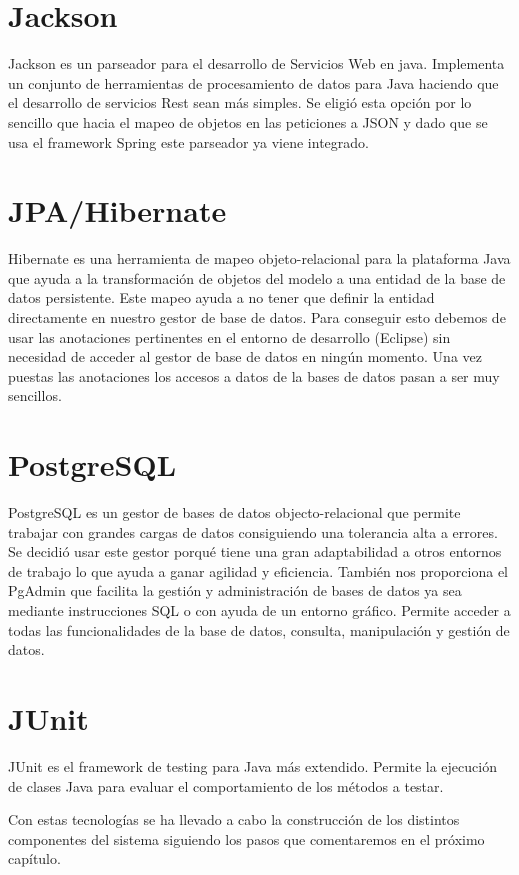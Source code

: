 \section{Jackson}

Jackson es un parseador para el desarrollo de Servicios Web en java. Implementa un conjunto de   herramientas de procesamiento de datos para Java haciendo que el desarrollo de servicios Rest sean más simples. Se eligió esta opción por lo sencillo que hacia el mapeo de objetos en las peticiones a JSON y dado que se usa el framework Spring este parseador ya viene integrado.








\section{JPA/Hibernate}
Hibernate es una herramienta de mapeo objeto-relacional para la plataforma Java que ayuda a la transformación de objetos del modelo a una entidad de la base de datos persistente. Este mapeo ayuda a  no tener que definir la entidad directamente en nuestro gestor de base de datos. Para conseguir esto debemos de usar las anotaciones pertinentes en el entorno de desarrollo (Eclipse) sin necesidad de acceder al gestor de base de datos en ningún momento. Una vez puestas las anotaciones los accesos a datos de la  bases de datos pasan a ser muy sencillos.





\section{PostgreSQL}
PostgreSQL es un gestor de bases de datos objecto-relacional  que permite trabajar con grandes cargas de datos consiguiendo una tolerancia alta a errores.
Se decidió usar este gestor porqué tiene una gran adaptabilidad a otros entornos de trabajo lo que ayuda a ganar agilidad y eficiencia. También nos proporciona  el PgAdmin que facilita la gestión y administración de bases de datos ya sea mediante instrucciones SQL o con ayuda de un entorno gráfico. Permite acceder a todas las funcionalidades de la base de datos, consulta, manipulación y gestión de datos.
\section{JUnit}
JUnit es el framework de testing para Java más extendido.
Permite la ejecución de clases Java para evaluar el comportamiento de los métodos a testar.


\vspace{1cm}

Con estas tecnologías se ha llevado a cabo la construcción de los distintos componentes del sistema siguiendo los pasos que comentaremos en el próximo capítulo.

